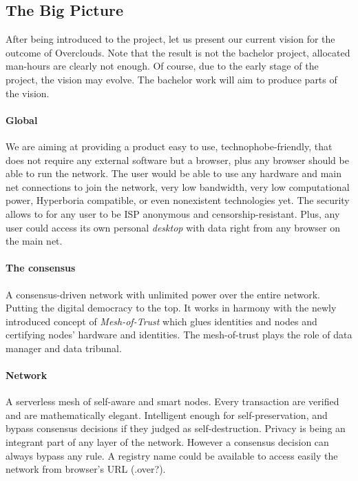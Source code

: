 
\subsection{The Big Picture}
After being introduced to the project, let us present our current vision for the outcome of Overclouds. Note that the result is not the bachelor project, allocated man-hours are clearly not enough. Of course, due to the early stage of the project, the vision may evolve. The bachelor work will aim to produce parts of the vision.

\paragraph{Global}
We are aiming at providing a product easy to use, technophobe-friendly, that does not require any external software but a browser, plus any browser should be able to run the network. The user would be able to use any hardware and main net connections to join the network, very low bandwidth, very low computational power, Hyperboria\cite{HypeHyperboriaWhitepaper} compatible, or even nonexistent technologies yet. The security allows to for any user to be ISP anonymous and censorship-resistant. Plus, any user could access its own personal \textit{desktop} with data right from any browser on the main net.

\paragraph{The consensus}
A consensus-driven network with unlimited power over the entire network. Putting the digital democracy to the top. It works in harmony with the newly introduced concept of \textit{Mesh-of-Trust} which glues identities and nodes and certifying nodes' hardware and identities. The mesh-of-trust plays the role of data manager and data tribunal.

\paragraph{Network}
A serverless mesh of self-aware and smart nodes. Every transaction are verified and are mathematically elegant. Intelligent enough for self-preservation, and bypass consensus decisions if they judged as self-destruction. Privacy is being an integrant part of any layer of the network. However a consensus decision can always bypass any rule. A registry name could be available to access easily the network from browser's URL (.over?).

